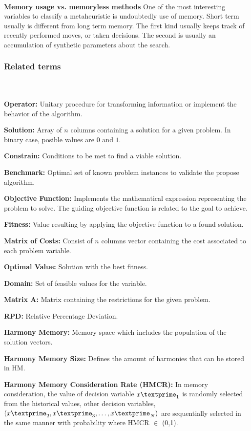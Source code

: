 ~\\
\textbf{Memory usage vs. memoryless methods}
One of the most interesting variables to classify a metaheuristic is undoubtedly use of memory. Short term usually is different from long term memory. The first kind usually keeps track of recently performed moves, or taken decisions. The second is usually an accumulation of synthetic parameters about the search. 

\subsubsection{Related terms}
~\\~\\
\textbf{Operator:} 
Unitary procedure for transforming information or implement the behavior of the algorithm.

\textbf{Solution:} 
Array of $n$ columns containing a solution for a given problem. In binary case, posible values are $0$ and $1$.

\textbf{Constrain:} 
Conditions to be met to find a viable solution.

\textbf{Benchmark:} 
Optimal set of known problem instances to validate the propose algorithm.

\textbf{Objective Function:}  
Implements the mathematical expression representing the problem to solve. The guiding objective function is related to the goal to achieve.

\textbf{Fitness:} 
Value resulting by applying the objective function to a found solution.

\textbf{Matrix of Costs:} 
Consist of $n$ columns vector containing the cost associated to each problem variable.

\textbf{Optimal Value:} 
Solution with the best fitness.

\textbf{Domain:} 
Set of feasible values for the variable.

\textbf{Matrix A:} 
Matrix containing the restrictions for the given problem.

\textbf{RPD:} 
Relative Percentage Deviation.

\textbf{Harmony Memory:} 
Memory space which includes the population of the solution vectors.

\textbf{Harmony Memory Size:} 
Defines the amount of harmonies that can be stored in HM.

\textbf{Harmony Memory Consideration Rate (HMCR):} 
In memory consideration, the value of decision variable ${x\textprime}_1$ is randomly selected from the historical values, other decision variables, $({x\textprime}_2, {x\textprime}_3,\dots,{x\textprime}_N)$ are sequentially selected in the same manner with probability where HMCR $\in$ (0,1).

